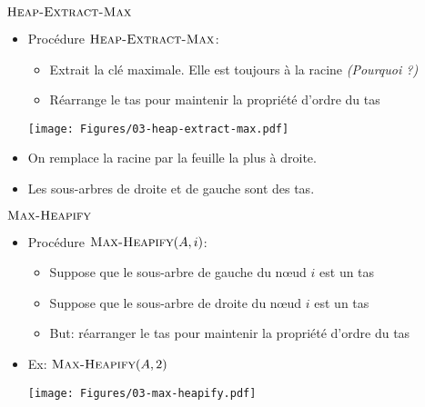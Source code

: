 \begin{frame}{$\textnormal{\scshape Heap-Extract-Max}$}

\begin{itemize}
\item Procédure $\textnormal{\scshape Heap-Extract-Max}$:
\begin{itemize}
\item Extrait la clé maximale. Elle est toujours à la racine \emph{(Pourquoi ?)}
\item Réarrange le tas pour maintenir la propriété d'ordre du tas
\end{itemize}

\centerline{\texttt{[image: Figures/03-heap-extract-max.pdf]}}

\item On remplace la racine par la feuille la plus à droite.
\item Les sous-arbres de droite et de gauche sont des tas.
\end{itemize}
\end{frame}

\begin{frame}{$\textnormal{\scshape Max-Heapify}$}

\begin{itemize}
\item Procédure $\textnormal{\scshape Max-Heapify}(A,i)$:
\begin{itemize}
\item Suppose que le sous-arbre de gauche du n\oe ud $i$ est un tas
\item Suppose que le sous-arbre de droite du n\oe ud $i$ est un tas
\item But: réarranger le tas pour maintenir la propriété d'ordre du tas
\end{itemize}
\item Ex: $\textnormal{\scshape Max-Heapify}(A,2)$
\centerline{\texttt{[image: Figures/03-max-heapify.pdf]}}
\end{itemize}

\end{frame}

